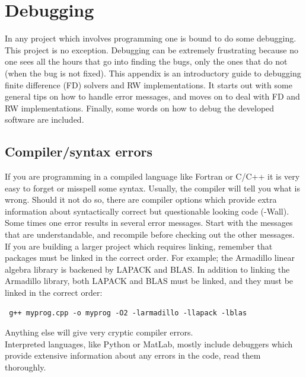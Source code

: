 \section{Debugging}\label{debugging}

In any project which involves programming one is bound to do some debugging. This project is no exception. 
Debugging can be extremely frustrating because no one sees all the hours that go into finding the bugs, only the ones that do not (when the bug is not fixed). 
This appendix is an introductory guide to debugging finite difference (FD) solvers and RW implementations. It starts out with some general tips on how to handle error messages, and moves on to deal with FD and RW implementations. 
Finally, some words on how to debug the developed software are included.

\subsection{Compiler/syntax errors}
If you are programming in a compiled language like Fortran or C/C++ it is very easy to forget or misspell some syntax. 
Usually, the compiler will tell you what is wrong. 
Should it not do so, there are compiler options which provide extra information about syntactically correct but questionable looking code (-Wall). 
Some times one error results in several error messages. 
Start with the messages that are understandable, and recompile before checking out the other messages. \\

\noindent If you are building a larger project which requires linking, remember that packages must be linked in the correct order. 
For example; the Armadillo linear algebra library is backened by LAPACK and BLAS. 
In addition to linking the Armadillo library, both LAPACK and BLAS must be linked, and they must be linked in the correct order: 
\begin{lstlisting}
 g++ myprog.cpp -o myprog -O2 -larmadillo -llapack -lblas
\end{lstlisting}
Anything else will give very cryptic compiler errors. \\

Interpreted languages, like Python or MatLab, mostly include debuggers which provide extensive information about any errors in the code, read them thoroughly.

